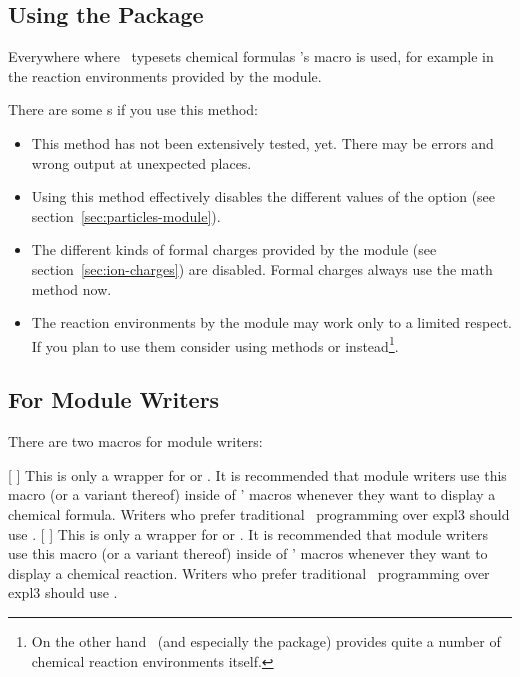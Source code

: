 \documentclass{chemmacros-manual}
\begin{document}
\subsection{Using the  Package}\label{sec:using-chemist}
Everywhere where \chemmacros\ typesets chemical formulas 's macro
 is used, for example in the reaction environments provided by
the  module.

There are some s if you use this method:
\begin{itemize}
  \item This method has not been extensively tested, yet.  There may be errors
     and wrong output at unexpected places.
  \item Using this method effectively disables the different values of the
     option  (see
    section~\ref{sec:particles-module}).
  \item The different kinds of formal charges provided by the
     module (see section~\ref{sec:ion-charges}) are
    disabled.  Formal charges always use the math method now.
  \item The reaction environments by the  module may
    work only to a limited respect.  If you plan to use them consider using
    methods  or  instead\footnote{On the other
      hand \XyMTeX\ (and especially the  package) provides quite
      a number of chemical reaction environments itself.}.
\end{itemize}

\subsection{For Module Writers}

There are two macros for module writers:
\begin{commands}
  [ ]
    This is only a wrapper for  or .  It is recommended that
    module writers use this macro (or a variant thereof) inside of
    \chemmacros' macros whenever they want to display a chemical formula.
    Writers who prefer traditional \LaTeXe\ programming over expl3 should use
    .
  [ ]
    This is only a wrapper for  or .  It is recommended that
    module writers use this macro (or a variant thereof) inside of
    \chemmacros' macros whenever they want to display a chemical reaction.
    Writers who prefer traditional \LaTeXe\ programming over expl3 should use
    .
\end{commands}
\end{document}
